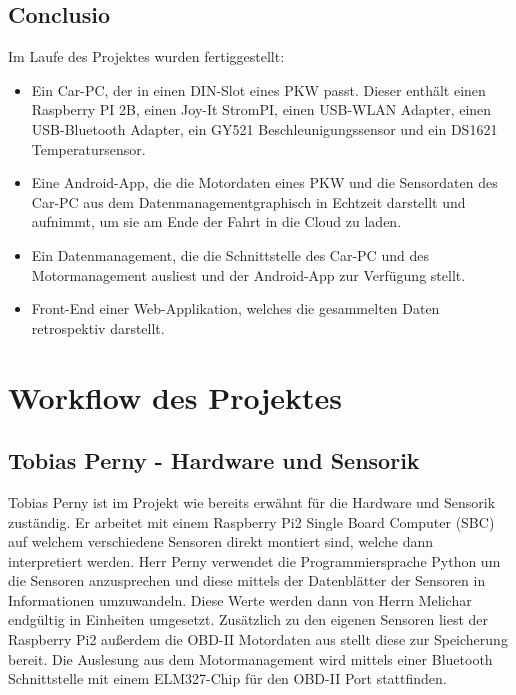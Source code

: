 \subsection{Conclusio}
Im Laufe des Projektes wurden fertiggestellt:
\begin{itemize}
\item Ein Car-PC, der in einen DIN-Slot eines PKW passt. Dieser enthält einen Raspberry PI 2B,
einen Joy-It StromPI,
einen USB-WLAN Adapter,
einen USB-Bluetooth Adapter,
ein GY521 Beschleunigungssensor und
ein DS1621 Temperatursensor.
\item Eine Android-App, die die Motordaten eines PKW und die Sensordaten des Car-PC aus dem Datenmanagementgraphisch in Echtzeit darstellt und aufnimmt, um sie am Ende der Fahrt in die Cloud zu laden.
\item Ein Datenmanagement, die die Schnittstelle des Car-PC und des Motormanagement ausliest und der Android-App zur Verfügung stellt.
\item Front-End einer Web-Applikation, welches die gesammelten Daten retrospektiv darstellt.
\end{itemize}
\section{\newline Workflow des Projektes}
	\subsection{Tobias Perny - Hardware und Sensorik}
	Tobias Perny ist im Projekt wie bereits erwähnt für die Hardware und Sensorik zuständig. Er arbeitet mit einem Raspberry Pi2 Single Board Computer (SBC) auf welchem verschiedene Sensoren direkt montiert sind, welche dann interpretiert werden. Herr Perny verwendet die Programmiersprache Python um die Sensoren anzusprechen und diese mittels der Datenblätter der Sensoren in Informationen umzuwandeln. Diese Werte werden dann von Herrn Melichar endgültig in Einheiten umgesetzt.
	Zusätzlich zu den eigenen Sensoren liest der Raspberry Pi2 außerdem die OBD-II Motordaten aus stellt diese zur Speicherung bereit. 
	Die Auslesung aus dem Motormanagement wird mittels einer Bluetooth Schnittstelle mit einem ELM327-Chip für den OBD-II Port stattfinden.

